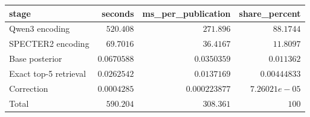 \begin{tabular}{lrrr}
\toprule
stage & seconds & ms\_per\_publication & share\_percent \\
\midrule
Qwen3 encoding & $520.408$ & $271.896$ & $88.1744$ \\
SPECTER2 encoding & $69.7016$ & $36.4167$ & $11.8097$ \\
Base posterior & $0.0670588$ & $0.0350359$ & $0.011362$ \\
Exact top-5 retrieval & $0.0262542$ & $0.0137169$ & $0.00444833$ \\
Correction & $0.0004285$ & $0.000223877$ & $7.26021e-05$ \\
Total & $590.204$ & $308.361$ & $100$ \\
\bottomrule
\end{tabular}
